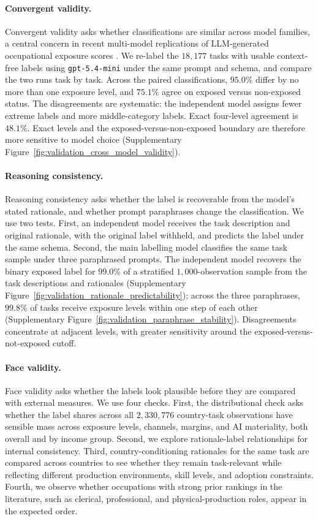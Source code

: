 \documentclass[11pt]{article}
\begin{document}
\paragraph{Convergent validity.} Convergent validity asks whether classifications are similar across model families, a central concern in recent multi-model replications of LLM-generated occupational exposure scores \citep{YinVuPersico2026LLMExposureStability}. We re-label the $18{,}177$ tasks with usable context-free labels using \texttt{gpt-5.4-mini} under the same prompt and schema, and compare the two runs task by task. Across the paired classifications, $95.0\%$ differ by no more than one exposure level, and $75.1\%$ agree on exposed versus non-exposed status. The disagreements are systematic: the independent model assigns fewer extreme labels and more middle-category labels. Exact four-level agreement is $48.1\%$. Exact levels and the exposed-versus-non-exposed boundary are therefore more sensitive to model choice (Supplementary Figure~\ref{fig:validation_cross_model_validity}).

\paragraph{Reasoning consistency.} Reasoning consistency asks whether the label is recoverable from the model's stated rationale, and whether prompt paraphrases change the classification. We use two tests. First, an independent model receives the task description and original rationale, with the original label withheld, and predicts the label under the same schema. Second, the main labelling model classifies the same task sample under three paraphrased prompts.
The independent model recovers the binary exposed label for $99.0\%$ of a stratified $1{,}000$-observation sample from the task descriptions and rationales (Supplementary Figure~\ref{fig:validation_rationale_predictability}); across the three paraphrases, $99.8\%$ of tasks receive exposure levels within one step of each other (Supplementary Figure~\ref{fig:validation_paraphrase_stability}). Disagreements concentrate at adjacent levels, with greater sensitivity around the exposed-versus-not-exposed cutoff.

\paragraph{Face validity.} Face validity asks whether the labels look plausible before they are compared with external measures. We use four checks. First, the distributional check asks whether the label shares across all $2{,}330{,}776$ country-task observations have sensible mass across exposure levels, channels, margins, and AI materiality, both overall and by income group. Second, we explore rationale-label relationships for internal consistency. Third, country-conditioning rationales for the same task are compared across countries to see whether they remain task-relevant while reflecting different production environments, skill levels, and adoption constraints. Fourth, we observe whether occupations with strong prior rankings in the literature, such as clerical, professional, and physical-production roles, appear in the expected order.
\end{document}
